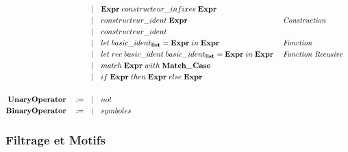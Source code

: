 \documentclass[
  12pt,
]{article}
\begin{document}
\begin{align*}
                                       & |\quad \textbf{Expr}\; constructeur\_infixes\; \textbf{Expr}                                                                         \\
                                       & |\quad constructeur\_ident  \; \textbf{Expr}\;                                                       &  & \textit{Construction}      \\
                                       & |\quad constructeur\_ident                                                                                                           \\
                                       & |\quad let \; basic\_ident_{\bf{list}} = \textbf{Expr}\; in \; \textbf{Expr}                         &  & \textit{Fonction}          \\
                                       & |\quad let \; rec \; basic\_ident \; basic\_ident_{\bf{list}} = \textbf{Expr}\; in \;\textbf{Expr}\; &  & \textit{Fonction Recusive} \\
                                       & |\quad match \; \textbf{Expr}\; with \; \textbf{Match\_Case}\quad                                                                    \\
                                       & |\quad if \; \textbf{Expr}\; then \; \textbf{Expr}\; else \; \textbf{Expr}                                                           \\
  \\
  \bf{UnaryOperator}  \quad :=  \quad  & |\quad  not                                                                                                                          \\
  \bf{BinaryOperator}  \quad :=  \quad & |\quad symboles                                                            \\
\end{align*}

\hypertarget{filtrage-et-motifs}{%
  \subsubsection{Filtrage et Motifs}\label{filtrage-et-motifs}}
\end{document}
